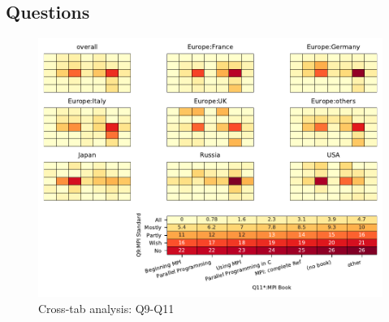 
\subsection{Questions}


\begin{figure}
\begin{center}
\includegraphics[width=12cm]{../pdfs/Q9-Q11.pdf}
\caption{Cross-tab analysis: Q9-Q11}
\label{fig:Q9-Q11}
\end{center}
\end{figure}
